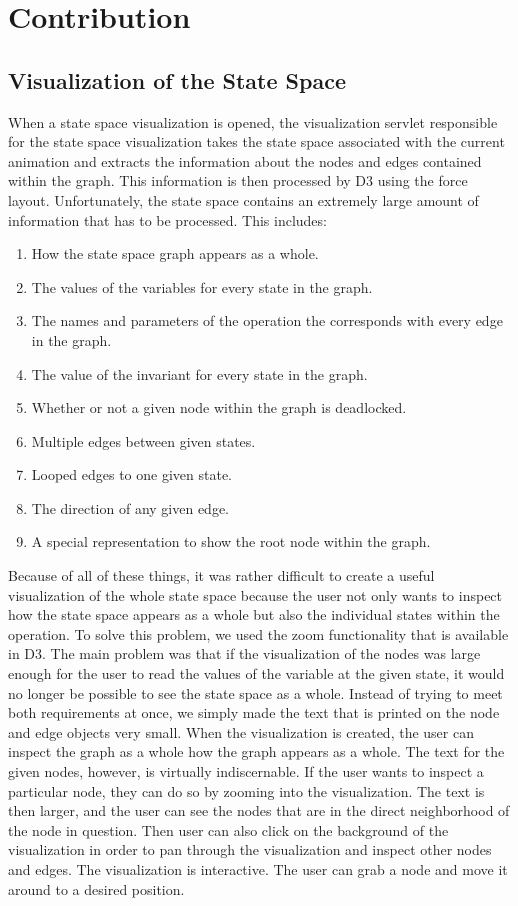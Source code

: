\section{Contribution}

\subsection{Visualization of the State Space}

When a state space visualization is opened, the visualization servlet responsible for the state space visualization takes the state space associated with the current animation and extracts the information about the nodes and edges contained within the graph. This information is then processed by D3 using the force layout. Unfortunately, the state space contains an extremely large amount of information that has to be processed. This includes:

\begin{enumerate}
\item{How the state space graph appears as a whole.}
\item{The values of the variables for every state in the graph.}
\item{The names and parameters of the operation the corresponds with every edge in the graph.}
\item{The value of the invariant for every state in the graph.}
\item{Whether or not a given node within the graph is deadlocked.}
\item{Multiple edges between given states.}
\item{Looped edges to one given state.}
\item{The direction of any given edge.}
\item{A special representation to show the root node within the graph.}
\end{enumerate}

Because of all of these things, it was rather difficult to create a useful visualization of the whole state space because the user not only wants to inspect how the state space appears as a whole but also the individual states within the operation. To solve this problem, we used the zoom functionality that is available in D3. The main problem was that if the visualization of the nodes was large enough for the user to read the values of the variable at the given state, it would no longer be possible to see the state space as a whole. Instead of trying to meet both requirements at once, we simply made the text that is printed on the node and edge objects very small. When the visualization is created, the user can inspect the graph as a whole how the graph appears as a whole. The text for the given nodes, however, is virtually indiscernable. If the user wants to inspect a particular node, they can do so by zooming into the visualization. The text is then larger, and the user can see the nodes that are in the direct neighborhood of the node in question. Then user can also click on the background of the visualization in order to pan through the visualization and inspect other nodes and edges. The visualization is interactive. The user can grab a node and move it around to a desired position.

